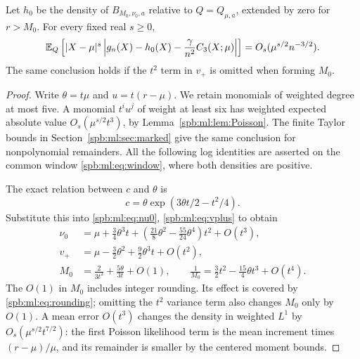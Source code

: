 \begin{theorem}\label{spb:ml:thm:cubic}
Let $h_0$ be the density of $B_{M_0,\nu_0,a}$ relative to $Q=Q_{\mu,a}$, extended by zero for $r>M_0$. For every fixed real $s\ge0$,
\begin{equation}\label{spb:ml:eq:cubic}
 \mathbb E_Q\left[|X-\mu|^s
  \left|g_n(X)-h_0(X)-\frac{\gamma}{n^2}C_3(X;\mu)\right|\right]
   =O_s(\mu^{s/2}n^{-3/2}).
\end{equation}
The same conclusion holds if the $t^2$ term in $v_+$ is omitted when forming $M_0$.
\end{theorem}
\begin{proof}
Write $\theta=t\mu$ and $u=t(r-\mu)$. We retain monomials of weighted degree at most five. A monomial $t^iu^j$ of weight at least six has weighted expected absolute value $O_s(\mu^{s/2}t^3)$, by Lemma~\ref{spb:ml:lem:Poisson}. The finite Taylor bounds in Section~\ref{spb:ml:sec:marked} give the same conclusion for nonpolynomial remainders. All the following log identities are asserted on the common window \eqref{spb:ml:eq:window}, where both densities are positive.

The exact relation between $c$ and $\theta$ is
\begin{equation}\label{spb:ml:eq:cTheta}
 c=\theta\exp(3\theta t/2-t^2/4).
\end{equation}
Substitute this into \eqref{spb:ml:eq:nu0}, \eqref{spb:ml:eq:vplus} to obtain
\begin{align}
 \nu_0&=\mu+\tfrac34\theta^3t+
                  (\tfrac{21}{8}\theta^2-\tfrac{55}{24}\theta^4)t^2+O(t^3),\label{spb:ml:eq:nutheta}\\
 v_+&=\mu-\tfrac32\theta^2+\tfrac92\theta^3t+O(t^2),\nonumber\\
 M_0&=\frac2{3t^2}+\frac{5\theta}{3t}+O(1),\qquad
 \frac1{M_0}=\tfrac32t^2-\tfrac{15}{4}\theta t^3+O(t^4).\label{spb:ml:eq:Mtheta}
\end{align}
The $O(1)$ in $M_0$ includes integer rounding. Its effect is covered by \eqref{spb:ml:eq:rounding}; omitting the $t^2$ variance term also changes $M_0$ only by $O(1)$. A mean error $O(t^3)$ changes the density in weighted $L^1$ by $O_s(\mu^{s/2}t^{7/2})$: the first Poisson likelihood term is the mean increment times $(r-\mu)/\mu$, and its remainder is smaller by the centered moment bounds.


\end{proof}
